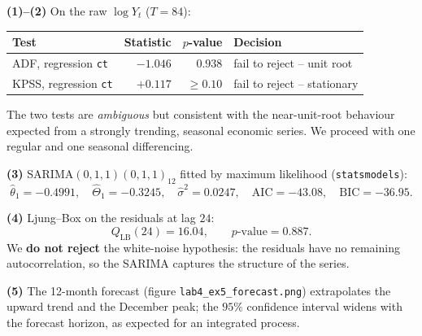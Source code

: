 \documentclass[a4paper,11pt]{article}
\begin{document}
\begin{exercise}\end{exercise}

\begin{solution}
\textbf{(1)--(2)} On the raw $\log Y_t$ ($T = 84$):
\begin{center}
\begin{tabular}{lrrl}
\toprule
Test                & Statistic & $p$-value & Decision \\
\midrule
ADF, regression \texttt{ct}    & $-1.046$ & $0.938$ & fail to reject -- unit root \\
KPSS, regression \texttt{ct}   & $+0.117$ & $\geq 0.10$ & fail to reject -- stationary \\
\bottomrule
\end{tabular}
\end{center}
The two tests are \emph{ambiguous} but consistent with the
near-unit-root behaviour expected from a strongly trending,
seasonal economic series. We proceed with one regular and one
seasonal differencing.

\textbf{(3)} SARIMA$(0,1,1)(0,1,1)_{12}$ fitted by maximum
likelihood (\texttt{statsmodels}):
\[
  \widehat\theta_1 = -0.4991,
  \quad
  \widehat\Theta_1 = -0.3245,
  \quad
  \widehat\sigma^2 = 0.0247,
  \quad
  \text{AIC} = -43.08,
  \quad
  \text{BIC} = -36.95.
\]

\textbf{(4)} Ljung--Box on the residuals at lag $24$:
\[
  Q_{\text{LB}}(24) = 16.04,
  \qquad
  p\text{-value} = 0.887.
\]
We \textbf{do not reject} the white-noise hypothesis: the residuals
have no remaining autocorrelation, so the SARIMA captures the
structure of the series.

\textbf{(5)} The 12-month forecast (figure
\texttt{lab4\_ex5\_forecast.png}) extrapolates the upward trend and
the December peak; the $95\%$ confidence interval widens with the
forecast horizon, as expected for an integrated process.
\end{solution}
\end{document}
